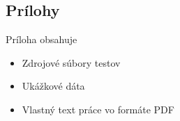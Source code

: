 \documentclass[
  printed, %
  notable,   %
  nolof,     %
    oneside,       %
  nolot,     %
]{fithesis3}
\begin{document}
  

\begin{appendix}


\chapter{Prílohy}
Príloha obsahuje
\begin{itemize}
	\item Zdrojové súbory testov
	\item Ukážkové dáta 
	\item Vlastný text práce vo formáte PDF
\end{itemize}



\end{appendix}
\end{document}
